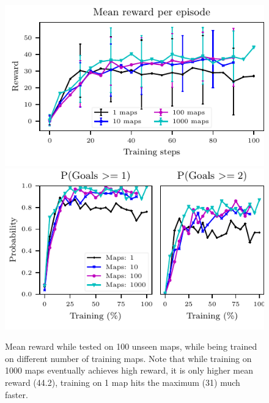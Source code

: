 \begin{figure}
 \vspace{-3em}%
\includegraphics[width=0.5\columnwidth]{images/plot_reward_3D-1000.pdf}%
\includegraphics[width=0.5\columnwidth]{images/plot_probability_3D-1000.pdf}%
\vspace{-1em}%
\caption{Mean reward while tested on 100 unseen maps, while being trained on different number of training maps. Note that while training on 1000 maps eventually achieves high reward, it is only higher mean reward (44.2), training on 1 map hits the maximum (31) much faster.}
\label{fig:plot_reward_on_testing}
\end{figure}

